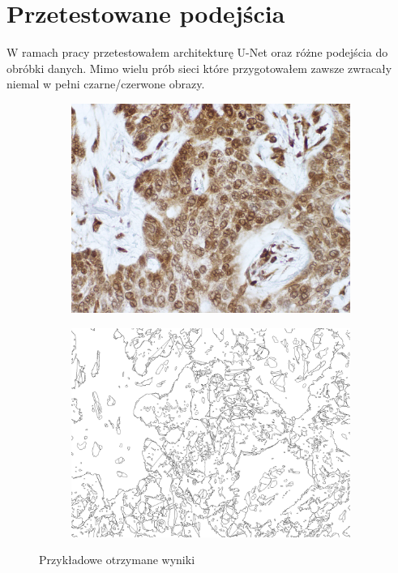 \documentclass{article}
\begin{document}
\section{Przetestowane podejścia}
W ramach pracy przetestowałem architekturę U-Net oraz różne podejścia do obróbki danych.
Mimo wielu prób sieci które przygotowałem zawsze zwracały niemal w pełni czarne/czerwone obrazy.
\begin{figure}[H]
    \centering
    \begin{subfigure}{0.4\linewidth}
        \includegraphics[width=\linewidth]{images/input.png}
    \end{subfigure}
    \begin{subfigure}{0.4\linewidth}
        \includegraphics[width=\linewidth]{images/output.jpg}
    \end{subfigure}
    \caption{Przykładowe otrzymane wyniki}
    \label{fig:input_and_output}
\end{figure}
\end{document}
